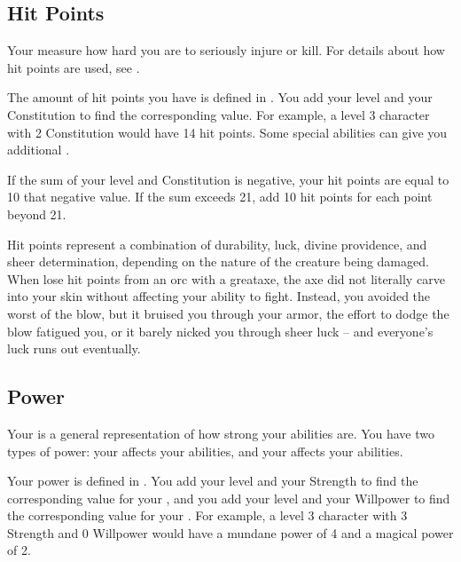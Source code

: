     \subsection{Hit Points}\label{Hit Points}
        Your  measure how hard you are to seriously injure or kill.
        For details about how hit points are used, see .

        The amount of hit points you have is defined in .
        You add your level and your Constitution to find the corresponding value.
        For example, a level 3 character with 2 Constitution would have 14 hit points.
        Some special abilities can give you additional .

        If the sum of your level and Constitution is negative, your hit points are equal to 10 \add that negative value.
        If the sum exceeds 21, add 10 hit points for each point beyond 21.

         Hit points represent a combination of durability, luck, divine providence, and sheer determination, depending on the nature of the creature being damaged.
        When lose hit points from an orc with a greataxe, the axe did not literally carve into your skin without affecting your ability to fight.
        Instead, you avoided the worst of the blow, but it bruised you through your armor, the effort to dodge the blow fatigued you, or it barely nicked you through sheer luck -- and everyone's luck runs out eventually.

    \subsection{Power}\label{Power}
        Your  is a general representation of how strong your abilities are.
        You have two types of power: your  affects your  abilities, and your  affects your  abilities.

        Your power is defined in .
        You add your level and your Strength to find the corresponding value for your , and you add your level and your Willpower to find the corresponding value for your .
        For example, a level 3 character with 3 Strength and 0 Willpower would have a mundane power of 4 and a magical power of 2.

